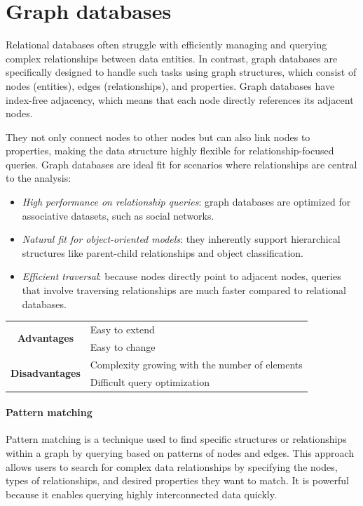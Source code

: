 \section{Graph databases}

Relational databases often struggle with efficiently managing and querying complex relationships between data entities. 
In contrast, graph databases are specifically designed to handle such tasks using graph structures, which consist of nodes (entities), edges (relationships), and properties.
Graph databases have index-free adjacency, which means that each node directly references its adjacent nodes. 

They not only connect nodes to other nodes but can also link nodes to properties, making the data structure highly flexible for relationship-focused queries.
Graph databases are ideal fit for scenarios where relationships are central to the analysis:
\begin{itemize}
    \item \textit{High performance on relationship queries}: graph databases are optimized for associative datasets, such as social networks.
    \item \textit{Natural fit for object-oriented models}: they inherently support hierarchical structures like parent-child relationships and object classification.
    \item \textit{Efficient traversal}: because nodes directly point to adjacent nodes, queries that involve traversing relationships are much faster compared to relational databases.
\end{itemize}
\renewcommand*{\arraystretch}{2}
\begin{table}[H]
    \centering
    \begin{tabular}{|c|l|}
    \hline
    \multirow{2}{*}{\textbf{Advantages}}    & Easy to extend                                 \\
                                            & Easy to change                                 \\ \hline
    \multirow{2}{*}{\textbf{Disadvantages}} & Complexity growing with the number of elements \\
                                            & Difficult query optimization                   \\ \hline
    \end{tabular}
\end{table}
\renewcommand*{\arraystretch}{2}
\paragraph*{Pattern matching}
Pattern matching is a technique used to find specific structures or relationships within a graph by querying based on patterns of nodes and edges.
This approach allows users to search for complex data relationships by specifying the nodes, types of relationships, and desired properties they want to match.
It is powerful because it enables querying highly interconnected data quickly. 

